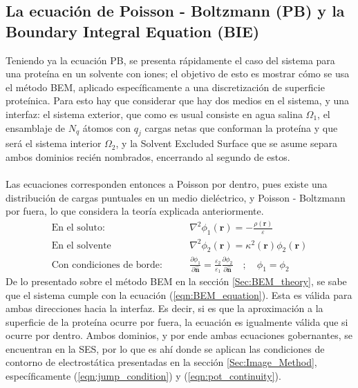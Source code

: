 \documentclass[12pt, twoside, onehalfspace, numbers, spanish]{ezthesis}
\numberwithin{equation}{section}
\begin{document}
\subsection{La ecuación de Poisson - Boltzmann (PB) y la Boundary Integral Equation (BIE)}\label{subsec:BIE_PB}
Teniendo ya la ecuación PB, se presenta rápidamente el caso del sistema para una proteína en un solvente con iones; el objetivo de esto es mostrar cómo se usa el método BEM, aplicado específicamente a una discretización de superficie proteínica. Para esto hay que considerar que hay dos medios en el sistema, y una interfaz: el sistema exterior, que como es usual consiste en agua salina $\Omega_1$, el ensamblaje de $N_q$ átomos con $q_j$ cargas netas que conforman la proteína y que será el sistema interior $\Omega_2$, y la Solvent Excluded Surface que se asume separa ambos dominios recién nombrados, encerrando al segundo de estos.\\\\
Las ecuaciones corresponden entonces a Poisson por dentro, pues existe una distribución de cargas puntuales en un medio dieléctrico, y Poisson - Boltzmann por fuera, lo que considera la teoría explicada anteriormente.
\begin{align*}
\text{En el soluto:}&\qquad\nabla^2\phi_1(\mathbf{r}) = -\frac{\rho(\mathbf{r})}{\varepsilon}\\
\text{En el solvente}&\qquad\nabla^2\phi_2(\mathbf{r}) = \kappa^2(\mathbf{r})\phi_2(\mathbf{r})\\
\text{Con condiciones de borde:}&\qquad \frac{\partial\phi_1}{\partial\hat{\mathbf{n}}} = \frac{\varepsilon_2}{\varepsilon_1}\frac{\partial\phi_2}{\partial\hat{\mathbf{n}}}\quad ; \quad \phi_1 = \phi_2
\end{align*}
De lo presentado sobre el método BEM en la sección \ref{Sec:BEM_theory}, se sabe que el sistema cumple con la ecuación (\ref{eqn:BEM_equation}).
Esta es válida para ambas direcciones hacia la interfaz. Es decir, si es que la aproximación a la superficie de la proteína ocurre por fuera, la ecuación es igualmente válida que si ocurre por dentro. Ambos dominios, y por ende ambas ecuaciones gobernantes, se encuentran en la SES, por lo que es ahí donde se aplican las condiciones de contorno de electrostática presentadas en la sección \ref{Sec:Image_Method}, específicamente (\ref{eqn:jump_condition}) y (\ref{eqn:pot_continuity}).
\end{document}
